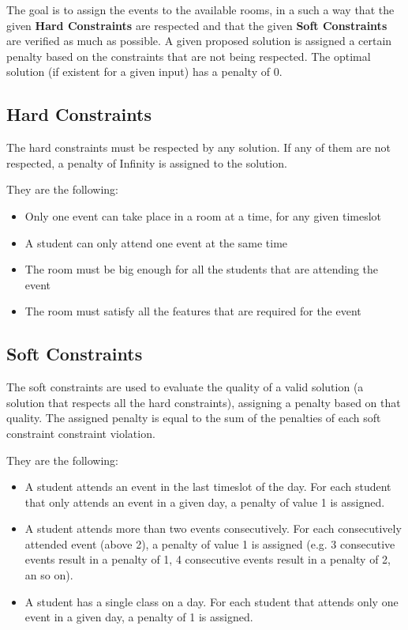 \documentclass[conference]{IEEEtran}
\begin{document}
The goal is to assign the events to the available rooms, in a such a way that the given \textbf{Hard Constraints} are respected and that the given \textbf{Soft Constraints} are verified as much as possible. A given proposed solution is assigned a certain penalty based on the constraints that are not being respected. The optimal solution (if existent for a given input) has a penalty of 0.

\subsection{Hard Constraints}

The hard constraints must be respected by any solution. If any of them are not respected, a penalty of Infinity is assigned to the solution.

They are the following:

\begin{itemize}
    \item Only one event can take place in a room at a time, for any given timeslot
    \item A student can only attend one event at the same time
    \item The room must be big enough for all the students that are attending the event
    \item The room must satisfy all the features that are required for the event
\end{itemize}

\subsection{Soft Constraints}

The soft constraints are used to evaluate the quality of a valid solution (a solution that respects all the hard constraints), assigning a penalty based on that quality. The assigned penalty is equal to the sum of the penalties of each soft constraint constraint violation.

They are the following: 

\begin{itemize}
    \item A student attends an event in the last timeslot of the day. For each student that only attends an event in a given day, a penalty of value 1 is assigned.
    \item A student attends more than two events consecutively. For each consecutively attended event (above 2), a penalty of value 1 is assigned (e.g. 3 consecutive events result in a penalty of 1, 4 consecutive events result in a penalty of 2, an so on). 
    \item A student has a single class on a day. For each student that attends only one event in a given day, a penalty of 1 is assigned.
\end{itemize}
\end{document}
